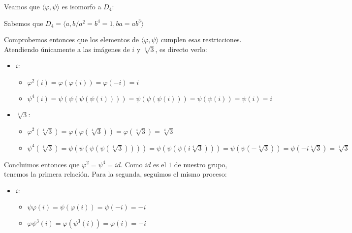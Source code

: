 \documentclass[a4paper, 11pt]{article}
\begin{document}
  \maketitle

  \begin{ejercicio}
  \end{ejercicio}

  \begin{solucion}
      \begin{apartado}
          Veamos que $\langle\varphi,\psi\rangle$ es isomorfo a $D_4$:

          Sabemos que $D_4 = \langle a,b / a^2 = b^4 = 1, ba = ab^3 \rangle$

          Comprobemos entonces que los elementos de $\langle\varphi,\psi\rangle$ cumplen esas restricciones. Atendiendo únicamente a las imágenes de $i$ y $\sqrt[4]{3}$, es directo verlo:

          \begin{itemize}
              \item \textbf{$i$}:
              \begin{itemize}
                  \item $\varphi^2(i) = \varphi(\varphi(i)) = \varphi(-i) = i$
                  \item $\psi^4(i) = \psi(\psi(\psi(\psi(i)))) = \psi(\psi(\psi(i))) = \psi(\psi(i)) = \psi(i) = i$
              \end{itemize}

              \item \textbf{$\sqrt[4]{3}$}:
              \begin{itemize}
                  \item $\varphi^2(\sqrt[4]{3}) = \varphi(\varphi(\sqrt[4]{3})) = \varphi(\sqrt[4]{3}) = \sqrt[4]{3}$
                  \item $\psi^4(\sqrt[4]{3}) = \psi(\psi(\psi(\psi(\sqrt[4]{3})))) = \psi(\psi(\psi(i\sqrt[4]{3}))) = \psi(\psi(-\sqrt[4]{3})) = \psi(-i\sqrt[4]{3}) = \sqrt[4]{3}$
              \end{itemize}
          \end{itemize}

          Concluimos entonces que $\varphi^2 = \psi^4 = id$. Como $id$ es el $1$ de nuestro grupo, tenemos la primera relación. Para la segunda, seguimos el mismo proceso:

          \begin{itemize}
              \item \textbf{$i$}:
              \begin{itemize}
                  \item $\psi\varphi(i) = \psi(\varphi(i)) = \psi(-i) = -i$
                  \item $\varphi\psi^3(i) = \varphi(\psi^3(i)) = \varphi(i) = -i$
              \end{itemize}


\end{itemize}
\end{apartado}
\end{solucion}
\end{document}
